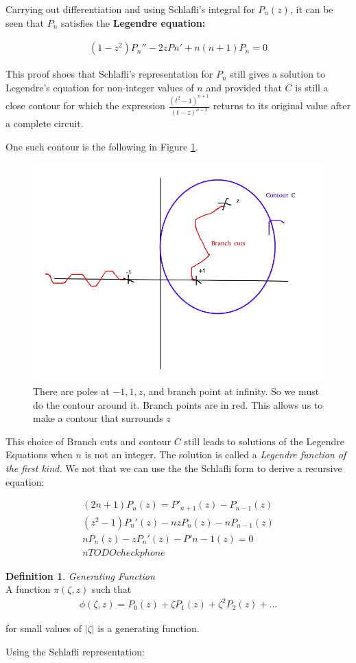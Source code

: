 \documentclass{article}
\theoremstyle{definition}
\newtheorem{definition}{Definition}[section]
\newcommand{\Def}[2]{
\begin{shaded*}
\begin{definition}{\textit{#1}}\\#2\end{definition}
\end{shaded*}
}
\newcommand{\eq}[1]{\begin{align*}
	#1
	\end{align*}}
\begin{document}
Carrying out differentiation and using Schlafli's integral  for $P_n(z)$, it can be seen that $P_n$ satisfies the \textbf{Legendre equation:}

\begin{align*}
(1-z^2)P_n'' - 2zPn' + n(n+1)P_n = 0
\end{align*}

This proof shoes that Schlafli's representation for $P_n$ still gives a solution to Legendre's equation for non-integer values of $n$ and provided that $C$ is still a close contour for which the expression  $\frac{(t^2-1)^{n+1}}{(t-z)^{n+2}}$ returns to its original value after a complete circuit.

One such contour is the following in Figure \ref{fig:legbp}.

\begin{figure}[H]
	\centering
	\includegraphics[width=0.7\linewidth]{leg_bp}
	\caption{There are poles at $-1, 1, z$, and branch point at infinity. So we must do the contour around it. Branch points are in red. This allows us to make a contour that surrounds $z$ }
	\label{fig:legbp}
\end{figure}

This choice of Branch cuts and contour $C$ still leads to solutions of the Legendre Equations when $n$ is not an integer. The solution is called a \textit{Legendre function of the first kind.} We not that we can use the the Schlafli form to derive a recursive equation:

\eq{(2n+1)P_n(z) = P'_{n+1}(z) - P_{n-1}(z)\\
	(z^2-1)P_n'(z)-nzP_n(z) -nP_{n-1}(z) \\
	nP_n(z) - zP_n'(z) - P'{n-1}(z)=0 \\ 
	n TODO check phone
}

\Def{Generating Function}{
A function $\pi(\zeta, z)$ such that 
\eq{\phi(\zeta, z) = P_0(z) + \zeta P_1(z) + \zeta^2 P_2(z) + ...}

for small values of $|\zeta|$ is a generating function.
}
Using the Schlafli representation:
\end{document}
